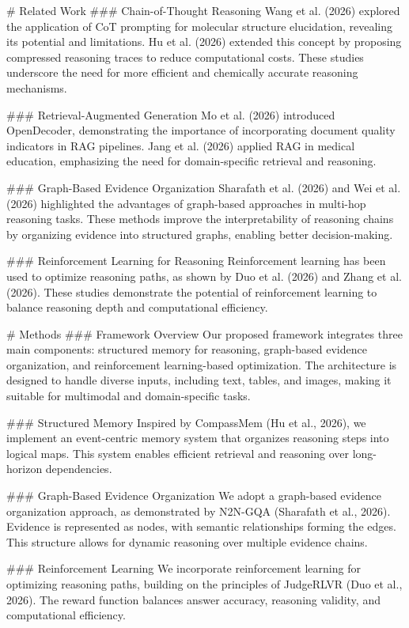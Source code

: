 # Related Work
### Chain-of-Thought Reasoning
Wang et al. (2026) explored the application of CoT prompting for molecular structure elucidation, revealing its potential and limitations. Hu et al. (2026) extended this concept by proposing compressed reasoning traces to reduce computational costs. These studies underscore the need for more efficient and chemically accurate reasoning mechanisms.

### Retrieval-Augmented Generation
Mo et al. (2026) introduced OpenDecoder, demonstrating the importance of incorporating document quality indicators in RAG pipelines. Jang et al. (2026) applied RAG in medical education, emphasizing the need for domain-specific retrieval and reasoning.

### Graph-Based Evidence Organization
Sharafath et al. (2026) and Wei et al. (2026) highlighted the advantages of graph-based approaches in multi-hop reasoning tasks. These methods improve the interpretability of reasoning chains by organizing evidence into structured graphs, enabling better decision-making.

### Reinforcement Learning for Reasoning
Reinforcement learning has been used to optimize reasoning paths, as shown by Duo et al. (2026) and Zhang et al. (2026). These studies demonstrate the potential of reinforcement learning to balance reasoning depth and computational efficiency.

# Methods
### Framework Overview
Our proposed framework integrates three main components: structured memory for reasoning, graph-based evidence organization, and reinforcement learning-based optimization. The architecture is designed to handle diverse inputs, including text, tables, and images, making it suitable for multimodal and domain-specific tasks.

### Structured Memory
Inspired by CompassMem (Hu et al., 2026), we implement an event-centric memory system that organizes reasoning steps into logical maps. This system enables efficient retrieval and reasoning over long-horizon dependencies.

### Graph-Based Evidence Organization
We adopt a graph-based evidence organization approach, as demonstrated by N2N-GQA (Sharafath et al., 2026). Evidence is represented as nodes, with semantic relationships forming the edges. This structure allows for dynamic reasoning over multiple evidence chains.

### Reinforcement Learning
We incorporate reinforcement learning for optimizing reasoning paths, building on the principles of JudgeRLVR (Duo et al., 2026). The reward function balances answer accuracy, reasoning validity, and computational efficiency.

